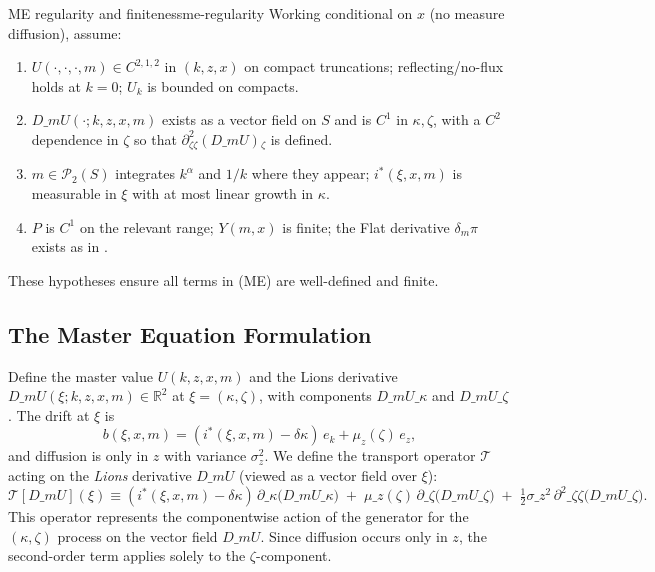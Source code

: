 \documentclass[11pt,letterpaper,oneside]{article}
\numberwithin{equation}{section}
\newcommand{\R}{\mathbb{R}}
\newcommand{\1}{\mathbf{1}}
\newcommand{\dmU}{D\_m U}
\newcommand{\Dm}{D\_m}
\begin{document}
\begin{assumption}{ME regularity and finiteness}{me-regularity}
Working conditional on $x$ (no measure diffusion), assume:
\begin{enumerate}[label=(\alph*),itemsep=0.2em]
  \item $U(\cdot,\cdot,\cdot, m)\in C^{2,1,2}$ in $(k,z,x)$ on compact truncations; reflecting/no-flux holds at $k=0$; $U_k$ is bounded on compacts.
  \item $\Dm U(\cdot; k,z,x,m)$ exists as a vector field on $S$ and is $C^1$ in $\kappa,\zeta$, with a $C^2$ dependence in $\zeta$ so that $\partial_{\zeta\zeta}^2(\Dm U)\!_{\zeta}$ is defined.
  \item $m\in\mathcal P_2(S)$ integrates $k^\alpha$ and $1/k$ where they appear; $i^*(\xi,x,m)$ is measurable in $\xi$ with at most linear growth in $\kappa$.
  \item $P$ is $C^1$ on the relevant range; $Y(m,x)$ is finite; the Flat derivative $\delta_m \pi$ exists as in .
\end{enumerate}
These hypotheses ensure all terms in (ME) are well-defined and finite.
\end{assumption}

\subsection{The Master Equation Formulation}\label{sec:me-formulation}

Define the master value $U(k,z,x,m)$ and the Lions derivative $\dmU(\xi;k,z,x,m)\in\R^2$ at $\xi=(\kappa,\zeta)$, with components $\dmU\_\kappa$ and $\dmU\_\zeta$. The drift at $\xi$ is
\[
b(\xi,x,m)=(i^*(\xi,x,m)-\delta\kappa)\,e_k+\mu_z(\zeta)\,e_z,
\]
and diffusion is only in $z$ with variance $\sigma_z^2$. We define the transport operator $\mathcal{T}$ acting on the \emph{Lions} derivative $\dmU$ (viewed as a vector field over $\xi$):
\[
\mathcal{T}[\dmU](\xi) \equiv (i^*(\xi,x,m)-\delta\kappa)\,\partial\_\kappa\big(\dmU\_\kappa\big)
\; +\; \mu\_z(\zeta)\,\partial\_\zeta\big(\dmU\_\zeta\big)
\; +\; \tfrac12\sigma\_z^2\,\partial^2\_{\zeta\zeta}\big(\dmU\_\zeta\big).
\]
This operator represents the componentwise action of the generator for the $(\kappa,\zeta)$ process on the vector field $\Dm U$. Since diffusion occurs only in $z$, the second-order term applies solely to the $\zeta$-component.
\end{document}
